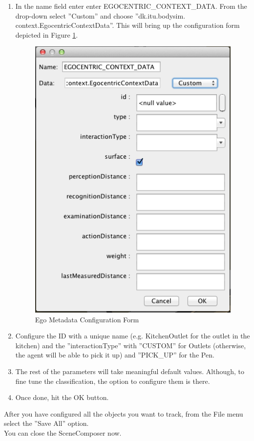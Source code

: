 \begin{enumerate}
	\item In the name field enter enter EGOCENTRIC\_CONTEXT\_DATA. From the drop-down select ''Custom'' and choose ''dk.itu.bodysim. context.EgocentricContextData''. This will bring up the configuration form depicted in Figure \ref{fig:sd_config_form}.
		\begin{figure}[H]
			\centering
			\includegraphics[width=0.8\linewidth]{gfx/Chapter_SD_UserGuide/ssmconfig}
			\caption{Ego Metadata Configuration Form}
			\label{fig:sd_config_form}
		\end{figure}

	\item Configure the ID with a unique name (e.g. KitchenOutlet for the outlet in the kitchen) and the ''interactionType'' with ''CUSTOM'' for Outlets (otherwise, the agent will be able to pick it up) and ''PICK\_UP'' for the Pen.

	\item The rest of the parameters will take meaningful default values. Although, to fine tune the classification, the option to configure them is there.

	\item Once done, hit the OK button.
\end{enumerate}

After you have configured all the objects you want to track, from the File menu select the ''Save All'' option.\\

You can close the SceneComposer now.\\
